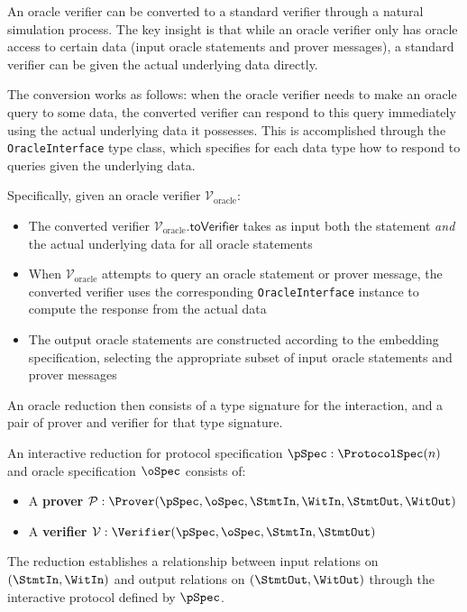 \begin{definition}
    \label{def:oracle_verifier_to_verifier}
    An oracle verifier can be converted to a standard verifier through a natural simulation process. The key insight is that while an oracle verifier only has oracle access to certain data (input oracle statements and prover messages), a standard verifier can be given the actual underlying data directly.

    The conversion works as follows: when the oracle verifier needs to make an oracle query to some data, the converted verifier can respond to this query immediately using the actual underlying data it possesses. This is accomplished through the \texttt{OracleInterface} type class, which specifies for each data type how to respond to queries given the underlying data.

    Specifically, given an oracle verifier $\mathcal{V}_{\text{oracle}}$:
    \begin{itemize}
        \item The converted verifier $\mathcal{V}_{\text{oracle}}.\mathsf{toVerifier}$ takes as input both the statement \emph{and} the actual underlying data for all oracle statements
        \item When $\mathcal{V}_{\text{oracle}}$ attempts to query an oracle statement or prover message, the converted verifier uses the corresponding \texttt{OracleInterface} instance to compute the response from the actual data
        \item The output oracle statements are constructed according to the embedding specification, selecting the appropriate subset of input oracle statements and prover messages
    \end{itemize}
\end{definition}

An oracle reduction then consists of a type signature for the interaction, and a pair of prover and
verifier for that type signature.

\begin{definition}
    \label{def:reduction}
    An interactive reduction for protocol specification $\pSpec : \ProtocolSpec(n)$ and oracle specification $\oSpec$ consists of:
    \begin{itemize}
        \item A \textbf{prover} $\mathcal{P} : \Prover(\pSpec, \oSpec, \StmtIn, \WitIn, \StmtOut, \WitOut)$
        \item A \textbf{verifier} $\mathcal{V} : \Verifier(\pSpec, \oSpec, \StmtIn, \StmtOut)$
    \end{itemize}

    The reduction establishes a relationship between input relations on $(\StmtIn, \WitIn)$ and output relations on $(\StmtOut, \WitOut)$ through the interactive protocol defined by $\pSpec$.
\end{definition}

